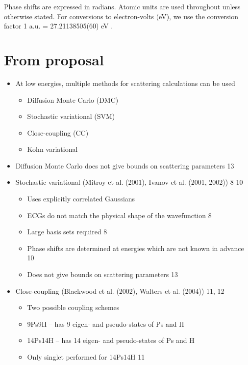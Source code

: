 \documentclass[Dissertation.tex]{subfiles}
\begin{document}
Phase shifts are expressed in radians. Atomic units are used throughout 
unless otherwise stated. For conversions to electron-volts (eV), we use the 
conversion factor 1 a.u. = {27.21138505(60) eV}
\cite{Mohr2012,*NISTConversions}.




\section{From proposal}

\begin{itemize}
	\item At low energies, multiple methods for scattering calculations can be used
	\begin{itemize}
		\item Diffusion Monte Carlo (DMC)
		\item Stochastic variational (SVM)
		\item Close-coupling (CC)
		\item Kohn variational
	\end{itemize}

	\item Diffusion Monte Carlo does not give bounds on scattering parameters 13

	\item Stochastic variational (Mitroy et al. (2001), Ivanov et al. (2001, 2002)) 8-10
	\begin{itemize}
		\item Uses explicitly correlated Gaussians
		\item ECGs do not match the physical shape of the wavefunction 8
		\item Large basis sets required 8
		\item Phase shifts are determined at energies which are not known in advance 10
		\item Does not give bounds on scattering parameters 13
	\end{itemize}

	\item Close-coupling (Blackwood et al. (2002), Walters et al. (2004)) 11, 12
	\begin{itemize}
		\item Two possible coupling schemes
		\item 9Ps9H – has 9 eigen- and pseudo-states of Ps and H
		\item 14Ps14H – has 14 eigen- and pseudo-states of Ps and H
		\item Only singlet performed for 14Ps14H 11
	\end{itemize}
\end{itemize}
\end{document}
